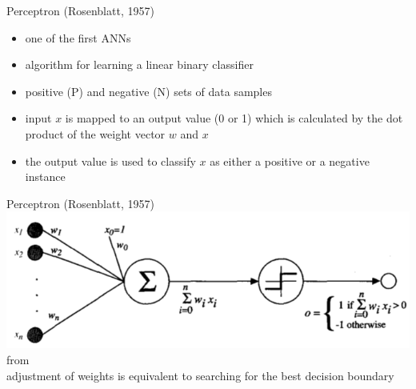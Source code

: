\documentclass{beamer}
\begin{document}
\begin{frame}{Perceptron (Rosenblatt, 1957)}
\begin{itemize}
\item one of the first ANNs
\item algorithm for learning a linear binary classifier
\item positive (P) and negative (N) sets of data samples
\item input $x$ is mapped to an output value (0 or 1) which is calculated by the dot product of the weight vector $w$ and $x$
\item the output value is used to classify $x$ as either a positive or a negative instance
\end{itemize}
\end{frame}

\begin{frame}{Perceptron (Rosenblatt, 1957)}
\centering
\includegraphics[width=1\textwidth]{perceptron1}\\from \cite{mitchell1997a}\\
adjustment of weights is equivalent to searching for the best decision boundary
\end{frame}
\end{document}
